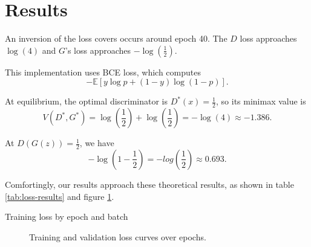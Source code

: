 \documentclass[11pt,a4paper]{article}
\begin{document}
\section{Results}

An inversion of the loss covers occurs around epoch 40. The \(D\) loss approaches \(\log(4)\) and \(G\)'s loss approaches \(-\log(\frac{1}{2})\).

This implementation uses BCE loss, which computes
\[
    -\mathbb{E}[y \log p + (1-y) \log (1-p)].
\]

At equilibrium, the optimal discriminator is \(D^*(x) = \frac{1}{2}\), so its minimax value is
\[
    V(D^*, G^*) = \log(\frac{1}{2}) + \log(\frac{1}{2}) = -\log(4) \approx -1.386.
\]

At \(D(G(z)) = \frac{1}{2}\), we have
\[
    -\log(1 - \frac{1}{2}) = -log(\frac{1}{2}) \approx 0.693.
\]

\noindent
Comfortingly, our results approach these theoretical results, as shown in table \ref{tab:loss-results} and figure \ref{fig:loss-curves}.

\begin{table}[ht]
    \centering
    \caption{Training loss by epoch and batch}
    \label{tab:loss-results}
\end{table}

\begin{figure}[ht]
    \centering
    \caption{Training and validation loss curves over epochs.}
    \label{fig:loss-curves}
\end{figure}
\end{document}
